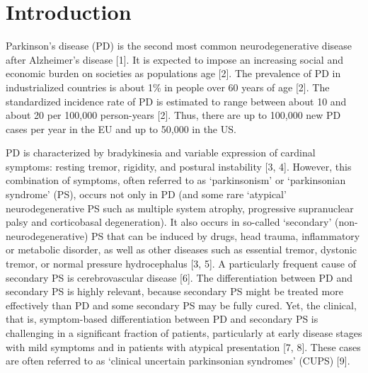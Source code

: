 \section{Introduction}
\label{sec:intro}


Parkinson's disease (PD) is the second most common neurodegenerative disease after Alzheimer's disease [1]. 
It is expected to impose an increasing social and economic burden on societies as populations age [2]. 
The prevalence of PD in industrialized countries is about 1\% in people over 60 years of age [2]. 
The standardized incidence rate of PD is estimated to range between about 10 and about 20 per 100,000 person-years [2]. 
Thus, there are up to 100,000 new PD cases per year in the EU and up to 50,000 in the US.

PD is characterized by bradykinesia and variable expression of cardinal symptoms: resting tremor, rigidity, and postural instability [3, 4]. 
However, this combination of symptoms, often referred to as `parkinsonism' or `parkinsonian syndrome' (PS), 
occurs not only in PD (and some rare `atypical' neurodegenerative PS such as multiple system atrophy, progressive 
supranuclear palsy and corticobasal degeneration). 
It also occurs in so-called `secondary' (non-neurodegenerative) PS that can be induced by drugs, head trauma, 
inflammatory or metabolic disorder, as well as other diseases such as essential tremor, dystonic tremor, or normal pressure hydrocephalus [3, 5]. 
A particularly frequent cause of secondary PS is cerebrovascular disease [6]. 
The differentiation between PD and secondary PS is highly relevant, 
because secondary PS might be treated more effectively than PD and some secondary PS may be fully cured.
Yet, the clinical, that is, symptom-based differentiation between PD and secondary PS is challenging in a significant fraction of patients, 
particularly at early disease stages with mild symptoms and in patients with atypical presentation [7, 8]. 
These cases are often referred to as `clinical uncertain parkinsonian syndromes' (CUPS) [9].

